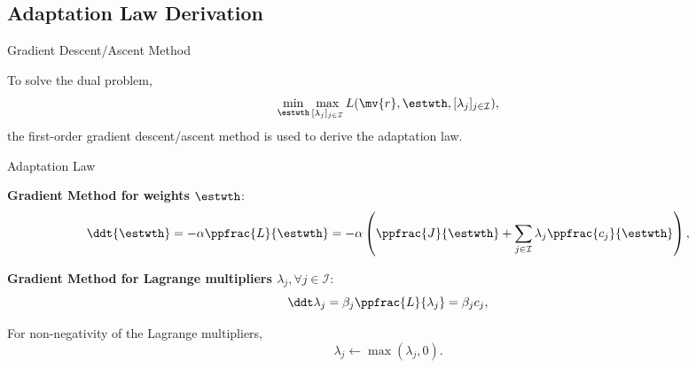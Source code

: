 \documentclass[8pt, aspectratio=169, handout]{beamer}
\newcommand{\ctxt}[2]{\color{#1}{#2}\color{black}}
\begin{document}
\subsection{Adaptation Law Derivation}

\begin{frame}{\insertsubsectionhead}{Gradient Descent/Ascent Method}
  
  To solve the dual problem, 
  \begin{equation}
    \min_{\estwth}\max_{[\lambda_j]_{j\in\mathcal{I}}} 
    L(\mv{r},\estwth,[\lambda_j]_{j\in\mathcal{I}})
    ,
  \end{equation}
  the first-order gradient descent/ascent method is used to derive the adaptation law.

  \centering
  \begin{minipage}{0.6\textwidth}%

    \begin{block}{Adaptation Law}%
      
    {
      \textbf{Gradient \ctxt{airforceblue}{Descent } Method for weights $\estwth$}:
      \begin{equation}\label{eq:adaptation_law:1}
        \ddt {{\estwth}}
        =
        -\alpha 
        \ppfrac{L}{{\estwth}}
        =-\alpha 
        \left(
            \ppfrac{J}{{\estwth}}
            +
            \sum_{j\in\mathcal{I}}
            \lambda_j 
            \ppfrac{c_j}{\estwth}
        \right),
      \end{equation}
    }

    {
      \textbf{Gradient \ctxt{awesome}{Ascent } Method for Lagrange multipliers $\lambda_j, \forall j\in\mathcal I$}:
      \begin{equation}\label{eq:adaptation_law:2}
        \ddt\lambda_j
        = 
        \beta_j
        \ppfrac{L}{\lambda_j} 
        = 
        \beta_j c_j ,
      \end{equation}
    }

    {
      For non-negativity of the Lagrange multipliers,
      \begin{equation}\label{eq:adaptation_law:3}
        \lambda_j
        \leftarrow
        \max(\lambda_j,0)
        .
      \end{equation}
    }

    \end{block}
  \end{minipage}
\end{frame}
\end{document}
